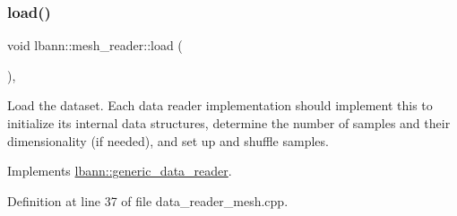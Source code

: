 \subsubsection{\texorpdfstring{load()}{load()}}
{\footnotesize\ttfamily void lbann\+::mesh\+\_\+reader\+::load (\begin{DoxyParamCaption}{ }\end{DoxyParamCaption})\hspace{0.3cm}{\ttfamily [override]}, {\ttfamily [virtual]}}

Load the dataset. Each data reader implementation should implement this to initialize its internal data structures, determine the number of samples and their dimensionality (if needed), and set up and shuffle samples. 

Implements \hyperlink{classlbann_1_1generic__data__reader_afeb47703d988a230a59859cbfc178215}{lbann\+::generic\+\_\+data\+\_\+reader}.



Definition at line 37 of file data\+\_\+reader\+\_\+mesh.\+cpp.


